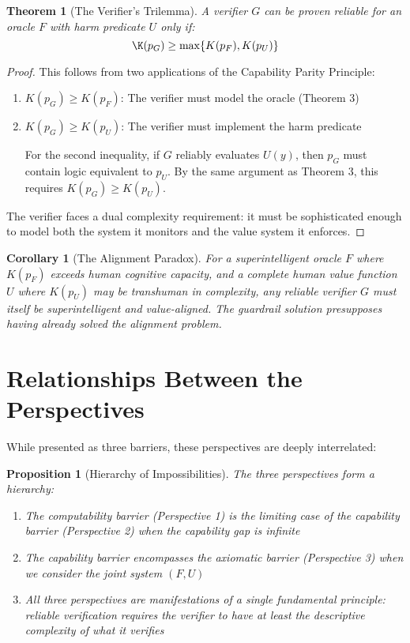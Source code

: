 \documentclass[11pt]{article}
\newtheorem{theorem}{Theorem}
\newtheorem{corollary}{Corollary}
\newtheorem{proposition}{Proposition}
\begin{document}
\begin{theorem}[The Verifier's Trilemma]
A verifier $G$ can be proven reliable for an oracle $F$ with harm predicate $U$ only if:
\[\K(p_G) \geq \max\{K(p_F), K(p_U)\}\]
\end{theorem}
\begin{proof}
This follows from two applications of the Capability Parity Principle:
\begin{enumerate}
\item $K(p_G) \geq K(p_F)$: The verifier must model the oracle (Theorem 3)
\item $K(p_G) \geq K(p_U)$: The verifier must implement the harm predicate

For the second inequality, if $G$ reliably evaluates $U(y)$, then $p_G$ must contain logic equivalent to $p_U$. By the same argument as Theorem 3, this requires $K(p_G) \geq K(p_U)$.
\end{enumerate}

The verifier faces a dual complexity requirement: it must be sophisticated enough to model both the system it monitors and the value system it enforces.
\end{proof}

\begin{corollary}[The Alignment Paradox]
For a superintelligent oracle $F$ where $K(p_F)$ exceeds human cognitive capacity, and a complete human value function $U$ where $K(p_U)$ may be transhuman in complexity, any reliable verifier $G$ must itself be superintelligent and value-aligned. The guardrail solution presupposes having already solved the alignment problem.
\end{corollary}

\section{Relationships Between the Perspectives}

While presented as three barriers, these perspectives are deeply interrelated:

\begin{proposition}[Hierarchy of Impossibilities]
The three perspectives form a hierarchy:
\begin{enumerate}
\item The computability barrier (Perspective 1) is the limiting case of the capability barrier (Perspective 2) when the capability gap is infinite
\item The capability barrier encompasses the axiomatic barrier (Perspective 3) when we consider the joint system $(F, U)$
\item All three perspectives are manifestations of a single fundamental principle: reliable verification requires the verifier to have at least the descriptive complexity of what it verifies
\end{enumerate}
\end{proposition}
\end{document}
